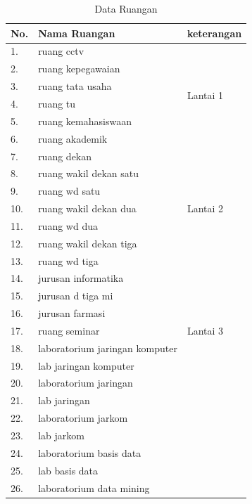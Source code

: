 \begin{enumerate}
	
	\begin{longtable}{| m{1cm} | m{6cm} | m{3cm} |}
    \caption{Data Ruangan}
    \label{t_data} \\
        \hline
        \textbf{No.}	& \textbf{Nama Ruangan}	& \textbf{keterangan}	\\
        \hline
		1.	& ruang cctv & \multirow{6}{*}{Lantai 1} \\ \cline{1-2}
		2.  & ruang kepegawaian					& \\ \cline{1-2}
		3.	& ruang tata usaha					& \\ \cline{1-2}
		4.	& ruang tu							& \\ \cline{1-2}
		5.	& ruang kemahasiswaan				& \\ \cline{1-2}
		6.	& ruang akademik					& \\
        \hline
        7.	& ruang dekan & \multirow{7}{*}{Lantai 2} \\ \cline{1-2}
		8.  & ruang wakil dekan satu			& \\ \cline{1-2}
		9.	& ruang wd satu						& \\ \cline{1-2}
		10.	& ruang wakil dekan dua				& \\ \cline{1-2}
		11.	& ruang wd dua						& \\ \cline{1-2}
		12.	& ruang wakil dekan tiga			& \\ \cline{1-2}
		13.	& ruang wd tiga						& \\ 
		\hline
		14.	& jurusan informatika & \multirow{7}{*}{Lantai 3} \\ \cline{1-2}
		15.	& jurusan d tiga mi					& \\ \cline{1-2}
		16. & jurusan farmasi					& \\ \cline{1-2}
		17.	& ruang seminar						& \\ \cline{1-2}
		18.	& laboratorium jaringan komputer	& \\ \cline{1-2}
		19.	& lab jaringan komputer				& \\ \cline{1-2}
		20.	& laboratorium jaringan				& \\ \cline{1-2}
		21. & lab jaringan						& \\ \cline{1-2}
		22.	& laboratorium jarkom				& \\ \cline{1-2}
		23.	& lab jarkom						& \\ \cline{1-2}
		24.	& laboratorium basis data			& \\ \cline{1-2}
		25.	& lab basis data					& \\ \cline{1-2}
		26.	& laboratorium data mining			& \\ \cline{1-2}

\end{longtable}
\end{enumerate}
